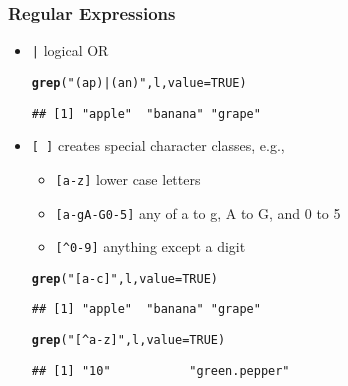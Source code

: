 \documentclass[paper=screen,mathserif]{beamer}\usepackage[]{graphicx}\usepackage[]{color}
\makeatletter
\newcommand{\hlnum}[1]{\textcolor[rgb]{0.686,0.059,0.569}{#1}}%
\newcommand{\hlstr}[1]{\textcolor[rgb]{0.192,0.494,0.8}{#1}}%
\newcommand{\hlstd}[1]{\textcolor[rgb]{0.345,0.345,0.345}{#1}}%
\newcommand{\hlkwc}[1]{\textcolor[rgb]{0.333,0.667,0.333}{#1}}%
\newcommand{\hlkwd}[1]{\textcolor[rgb]{0.737,0.353,0.396}{\textbf{#1}}}%
\newenvironment{kframe}{%
 \def\at@end@of@kframe{}%
 \ifinner\ifhmode%
  \def\at@end@of@kframe{\end{minipage}}%
  \begin{minipage}{\columnwidth}%
 \fi\fi%
 \def\FrameCommand##1{\hskip\@totalleftmargin \hskip-\fboxsep
 \colorbox{shadecolor}{##1}\hskip-\fboxsep
     \hskip-\linewidth \hskip-\@totalleftmargin \hskip\columnwidth}%
 \MakeFramed {\advance\hsize-\width
   \@totalleftmargin\z@ \linewidth\hsize
   \@setminipage}}%
 {\par\unskip\endMakeFramed%
 \at@end@of@kframe}
\newenvironment{knitrout}{}{} %
\newcommand{\ft}[1]{\frametitle{#1}}
\newenvironment{xframe}[1][]
{\begin{frame}[fragile,environment=xframe]
    \frametitle{#1}}
  {\end{frame}}
\makeatother
\begin{document}
\begin{xframe}
  \ft{Regular Expressions}
  
  \begin{itemize}
  \item {\tt |} logical OR
\begin{knitrout}\scriptsize
{}\color{fgcolor}\begin{kframe}
\begin{alltt}
\hlkwd{grep}\hlstd{(}\hlstr{"(ap)|(an)"}\hlstd{, l,} \hlkwc{value} \hlstd{=} \hlnum{TRUE}\hlstd{)}
\end{alltt}
\begin{verbatim}
## [1] "apple"  "banana" "grape"
\end{verbatim}
\end{kframe}
\end{knitrout}
\item \verb=[ ]= creates special character classes, e.g.,
  \begin{itemize}
  \item \verb=[a-z]= lower case letters
  \item \verb=[a-gA-G0-5]= any of a to g, A to G, and 0 to 5
  \item \verb=[^0-9]= anything except a digit
  \end{itemize}
\begin{knitrout}\scriptsize
{}\color{fgcolor}\begin{kframe}
\begin{alltt}
\hlkwd{grep}\hlstd{(}\hlstr{"[a-c]"}\hlstd{, l,} \hlkwc{value} \hlstd{=} \hlnum{TRUE}\hlstd{)}
\end{alltt}
\begin{verbatim}
## [1] "apple"  "banana" "grape"
\end{verbatim}
\begin{alltt}
\hlkwd{grep}\hlstd{(}\hlstr{"[^a-z]"}\hlstd{, l,} \hlkwc{value} \hlstd{=} \hlnum{TRUE}\hlstd{)}
\end{alltt}
\begin{verbatim}
## [1] "10"           "green.pepper"
\end{verbatim}
\end{kframe}
\end{knitrout}

  \end{itemize}
\end{xframe}
\end{document}

